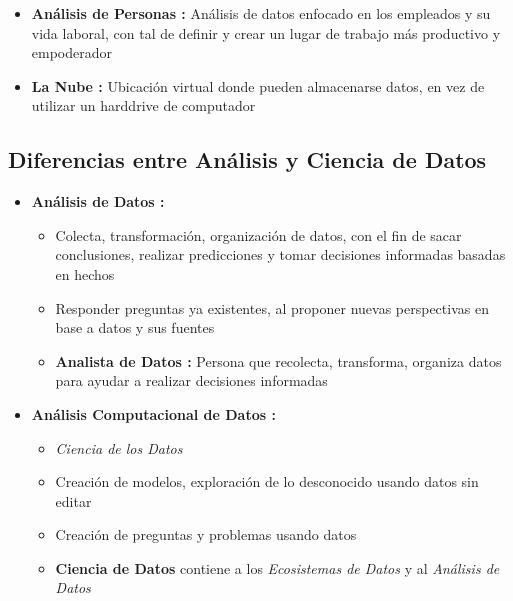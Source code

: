\begin{itemize}
    \item {\textbf{Análisis de Personas : }Análisis de datos enfocado en los empleados y su vida laboral, con tal de definir y crear un lugar de trabajo más productivo y empoderador}
    
    \item {\textbf{La Nube : }Ubicación virtual donde pueden almacenarse datos, en vez de utilizar un harddrive de computador}
\end{itemize}

\subsection{Diferencias entre Análisis y Ciencia de Datos}
\begin{itemize}
    \item {\textbf{Análisis de Datos : }
    \begin{itemize}
        \item {Colecta, transformación, organización de datos, con el fin de sacar conclusiones, realizar predicciones y tomar decisiones informadas basadas en hechos}
        \item {Responder preguntas ya existentes, al proponer nuevas perspectivas en base a datos y sus fuentes}
        \item {\textbf{Analista de Datos : }Persona que recolecta, transforma, organiza datos para ayudar a realizar decisiones informadas}
    \end{itemize}}
    \item {\textbf{Análisis Computacional de Datos : }
    \begin{itemize}
        \item {\textit{Ciencia de los Datos }}
        \item {Creación de modelos, exploración de lo desconocido usando datos sin editar}
        \item {Creación de preguntas y problemas usando datos}
        \item {\textbf{Ciencia de Datos} contiene a los \textit{Ecosistemas de Datos} y al \textit{Análisis de Datos}}
    \end{itemize}}
\end{itemize}

\newpage